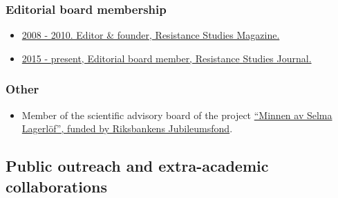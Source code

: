 \documentclass[a4paper,11pt,oneside]{article}
\begin{document}
    \subsubsection{Editorial board membership}
    \begin{itemize}
      \item \href{http://resistance-journal.org/the-old-rs-mag/}{2008 - 2010. Editor \& founder, Resistance Studies Magazine.}
      \item \href{http://resistance-journal.org/editorialboard/}{2015 - present, Editorial board member, Resistance Studies Journal.}
    \end{itemize}

    \subsubsection{Other}
        \begin{itemize}
          \item Member of the scientific advisory board of the project \href{http://anslag.rj.se/sv/anslag/52553}{``Minnen av Selma Lagerlöf'', funded by Riksbankens Jubileumsfond}.
        \end{itemize}







\subsection{Public outreach and extra-academic collaborations}
\end{document}
